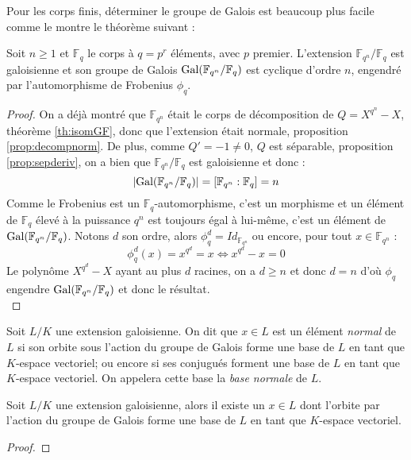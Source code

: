 \documentclass[a4paper]{article} %
\numberwithin{section}{part}
\numberwithin{equation}{section}
\newcommand\GF[1]{\mathbb{F}_{#1}}
\begin{document}
Pour les corps finis, déterminer le groupe de Galois est beaucoup plus facile
comme le montre le théorème suivant :

\begin{thm}
Soit $n\geq1$ et $\GF{q}$ le corps à $q=p^r$ éléments, avec $p$ premier.
L'extension $\GF{q^n}/\GF{q}$ est galoisienne et son groupe de Galois
$\textup{Gal}(\GF{q^n}/\GF{q})$ est cyclique d'ordre $n$, engendré par 
l'automorphisme de Frobenius $\phi_q$.
\end{thm}
\begin{proof}
On a déjà montré que $\GF{q^n}$ était le corps de décomposition de $Q = X^{q^n} 
- X$, théorème \ref{th:isomGF}, donc que l'extension était normale, proposition 
\ref{prop:decompnorm}. De plus, comme $Q' = -1 \neq 0$, $Q$ est séparable,
proposition \ref{prop:sepderiv}, on a bien que $\GF{q^n}/\GF{q}$ est galoisienne
et donc :
\[|\textup{Gal}(\GF{q^n}/\GF{q})| = [\GF{q^n}:\GF{q}] = n\]
Comme le Frobenius est un $\GF{q}$-automorphisme, c'est un morphisme et un 
élément de $\GF{q}$ élevé à la puissance $q^n$ est toujours égal à lui-même, 
c'est un élément de $\textup{Gal}(\GF{q^n}/\GF{q})$. Notons $d$ son ordre, alors
$\phi_q^d = Id_{\GF{q^n}}$ ou encore, pour tout $x\in\GF{q^n}$ :
\[\phi_q^d(x) = x^{q^d} = x \Leftrightarrow x^{q^d} - x = 0\]
Le polynôme $X^{q^d} - X$ ayant au plus $d$ racines, on a $d\geq n$ et donc $d =
n$ d'où $\phi_q$ engendre $\textup{Gal}(\GF{q^n}/\GF{q})$ et donc le
résultat.\\
\end{proof}

\begin{defn}
\label{def:elemnorm}
Soit $L/K$ une extension galoisienne. On dit que $x\in L$ est un élément
\emph{normal} de $L$ si son orbite sous l'action du groupe de Galois forme une 
base de $L$ en tant que $K$-espace vectoriel; ou encore si ses conjugués forment
une base de $L$ en tant que $K$-espace vectoriel. On appelera cette base la 
\emph{base normale} de $L$.
\end{defn}

\begin{thm}
Soit $L/K$ une extension galoisienne, alors il existe un $x\in L$ dont l'orbite
par l'action du groupe de Galois forme une base de $L$ en tant que $K$-espace
vectoriel.
\end{thm}
\begin{proof}
\end{proof}
\end{document}
